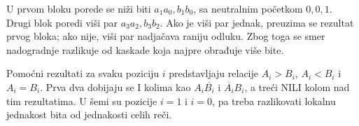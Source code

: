 U prvom bloku porede se niži biti $a_1a_0,b_1b_0$, sa neutralnim početkom $0,0,1$. Drugi blok poredi viši par $a_3a_2,b_3b_2$. Ako je viši par jednak, preuzima se rezultat prvog bloka; ako nije, viši par nadjačava raniju odluku. Zbog toga se smer nadogradnje razlikuje od kaskade koja najpre obrađuje više bite.

Pomoćni rezultati za svaku poziciju $i$ predstavljaju relacije $A_i>B_i$, $A_i<B_i$ i $A_i=B_i$. Prva dva dobijaju se I kolima kao $A_i\overline{B_i}$ i $\overline{A_i}B_i$, a treći NILI kolom nad tim rezultatima. U šemi su pozicije $i=1$ i $i=0$, pa treba razlikovati lokalnu jednakost bita od jednakosti celih reči.
